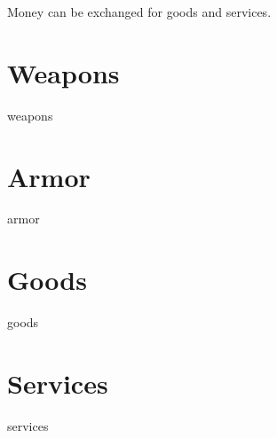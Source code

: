 Money can be exchanged for goods and services.

\section{Weapons}
{weapons}

\section{Armor}
{armor}

\section{Goods}
{goods}

\section{Services}
{services}
